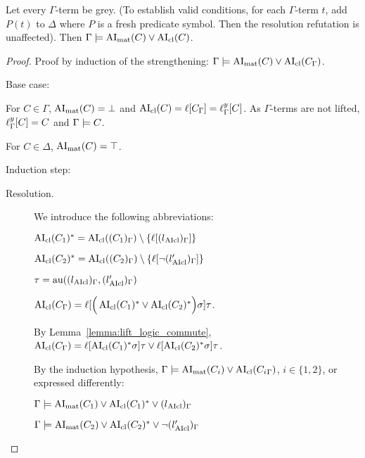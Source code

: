 \documentclass[,%
	paper=a4,%
	DIV14, %
	twoside=false,%
	liststotoc,
	bibtotoc,
	draft=false,%
	numbers=noendperiod
]{scrartcl}
\begin{document}
\begin{lemma}
	\label{ref:gamma_entails_delta_terms_lifted}
	Let every $\Gamma$-term be grey. (To establish valid conditions, for each $\Gamma$-term $t$, add $P(t)$ to $\Delta$ where $P$ is a fresh predicate symbol. Then the resolution refutation is unaffected).
	Then
	$\Gamma \models \operatorname{AI}_\mathrm{mat}(C) \lor \operatorname{AI}_\mathrm{cl}(C)$.
\end{lemma}
\begin{proof}
	Proof by induction of the strengthening:
	$\Gamma \models \operatorname{AI}_\mathrm{mat}(C) \lor \operatorname{AI}_\mathrm{cl}(C_\Gamma)$.

	Base case:

	For $C \in \Gamma$, $\operatorname{AI}_\mathrm{mat}(C) = \bot$ and $\operatorname{AI}_\mathrm{cl}(C) = \ell[C_\Gamma] = \ell_{\Gamma}^{y}[C]$. As $\Gamma$-terms are not lifted, $\ell_{\Gamma}^{y}[C] = C$ and $\Gamma \models C$.

	For $C \in \Delta$, $\operatorname{AI}_\mathrm{mat}(C) = \top$.

	Induction step:
	\begin{description}
		\item[Resolution.]\hfill
			\begin{prooftree}
			\end{prooftree}
			We introduce the following abbreviations:

			$ \operatorname{AI}_\mathrm{cl}(C_1)^* = \operatorname{AI}_\mathrm{cl}((C_1)_\Gamma) \setminus \{\ell[(l{_{\operatorname{AIcl}}})_\Gamma]\}$

			$ \operatorname{AI}_\mathrm{cl}(C_2)^* = \operatorname{AI}_\mathrm{cl}((C_2)_\Gamma)\setminus \{\ell[\lnot (l{_{\operatorname{AIcl}}'})_\Gamma]\}$

			$\tau  = \operatorname{au}((l{_{\operatorname{AIcl}}})_\Gamma, (l{_{\operatorname{AIcl}}'})_\Gamma)$

			$\operatorname{AI}_\mathrm{cl}(C_\Gamma) =
			\ell[\Big( \operatorname{AI}_\mathrm{cl}(C_1)^* \lor \operatorname{AI}_\mathrm{cl}(C_2)^* \Big)\sigma] \tau$.

			By Lemma~\ref{lemma:lift_logic_commute},
			$\operatorname{AI}_\mathrm{cl}(C_\Gamma) =
			\ell[\operatorname{AI}_\mathrm{cl}(C_1)^*\sigma]\tau \lor \ell[\operatorname{AI}_\mathrm{cl}(C_2)^*\sigma] \tau$.

			By the induction hypothesis,
			$\Gamma \models \operatorname{AI}_\mathrm{mat}(C_i) \lor \operatorname{AI}_\mathrm{cl}({C_i}_\Gamma)$, $i\in\{1,2\}$, or expressed differently:


			$\Gamma \models \operatorname{AI}_\mathrm{mat}(C_1) \lor \operatorname{AI}_\mathrm{cl}(C_1)^* \lor {(l{\ensuremath{_{\operatorname{AIcl}}}})_\Gamma}$

			$\Gamma \models \operatorname{AI}_\mathrm{mat}(C_2) \lor \operatorname{AI}_\mathrm{cl}(C_2)^* \lor {\lnot (l{\ensuremath{_{\operatorname{AIcl}}}'})_\Gamma}$


\end{description}
\end{proof}
\end{document}
